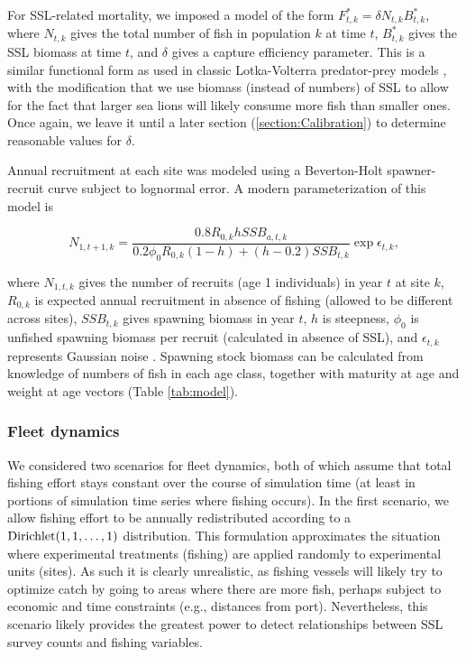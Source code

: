 \documentclass[nonumbib,leqno]{nrc1}
\begin{document}
For SSL-related mortality, we imposed a model of the form $F_{t,k}^*=\delta N_{t,k} B_{t,k}^*$, where $N_{t,k}$ gives the total number of fish in population $k$ at time $t$, $B_{t,k}^*$ gives the SSL biomass at time $t$, and $\delta$ gives a capture efficiency parameter. This is a similar functional form as used in classic Lotka-Volterra predator-prey models \citep[see e.g.][]{Gotelli2001}, with the modification that we use biomass (instead of numbers) of SSL to allow for the fact that larger sea lions will likely consume more fish than smaller ones.  Once again, we leave it until a later section (\ref{section:Calibration}) to determine reasonable values for $\delta$.

Annual recruitment at each site was modeled using a Beverton-Holt spawner-recruit curve subject to lognormal error.  A modern parameterization of this model is
\begin{linenomath}
\begin{equation*}
N_{1,t+1,k} = \frac{0.8 R_{0,k} h SSB_{a,t,k}}{0.2 \phi_0 R_{0,k}(1-h)+(h-0.2)SSB_{t,k}} \exp{\epsilon_{t,k}},
\end{equation*}
\end{linenomath}
where $N_{1,t,k}$ gives the number of recruits (age 1 individuals) in year $t$ at site $k$, $R_{0,k}$ is expected annual recruitment in absence of fishing (allowed to be different across sites), $SSB_{t,k}$ gives spawning biomass in year $t$, $h$ is steepness, $\phi_0$ is unfished spawning biomass per recruit (calculated in absence of SSL), and $\epsilon_{t,k}$ represents Gaussian noise \citep{MaceDoonan1988}.  Spawning stock biomass can be calculated from knowledge of numbers of fish in each age class, together with maturity at age and weight at age vectors (Table \ref{tab:model}).

\subsubsection{Fleet dynamics}
\label{section:Fleet}

We considered two scenarios for fleet dynamics, both of which assume that total fishing effort stays constant
over the course of simulation time (at least in portions of simulation time series where fishing occurs).  In the first scenario, we allow fishing effort to be annually redistributed according to a ${\rm Dirichlet}(1,1,\hdots,1)$ distribution.  This formulation approximates the situation where experimental treatments (fishing) are applied randomly to experimental units (sites).  As such it is clearly unrealistic, as fishing vessels will likely try to optimize catch by going to areas where there are more fish, perhaps subject
to economic and time constraints (e.g., distances from port).  Nevertheless, this scenario likely provides the greatest power to detect relationships between SSL survey counts and fishing variables.
\end{document}
